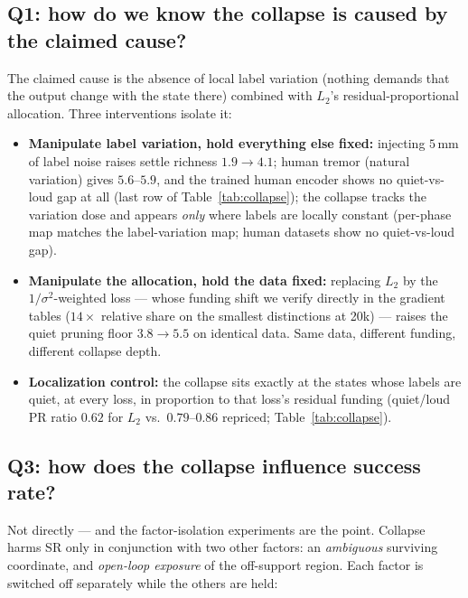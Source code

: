 \documentclass[11pt]{article}
\begin{document}
\subsection*{Q1: how do we know the collapse is caused by the claimed cause?}
The claimed cause is the absence of local label variation (nothing demands
that the output change with the state there) combined with $L_2$'s
residual-proportional allocation. Three interventions isolate it:
\begin{itemize}[leftmargin=1.5em,itemsep=0.2em]
\item \textbf{Manipulate label variation, hold everything else fixed:}
injecting $5$\,mm of label noise raises settle richness $1.9 \to 4.1$; human
tremor (natural variation) gives $5.6$--$5.9$, and the trained human encoder
shows no quiet-vs-loud gap at all (last row of Table~\ref{tab:collapse});
the collapse tracks the variation dose and appears \emph{only} where labels are locally constant
(per-phase map matches the label-variation map; human datasets show no
quiet-vs-loud gap).
\item \textbf{Manipulate the allocation, hold the data fixed:} replacing
$L_2$ by the $1/\sigma^2$-weighted loss --- whose funding shift we verify
directly in the gradient tables ($14\times$ relative share on the smallest
distinctions at 20k) --- raises the quiet pruning floor $3.8 \to 5.5$ on
identical data. Same data, different funding, different collapse depth.
\item \textbf{Localization control:} the collapse sits exactly at the states
whose labels are quiet, at every loss, in proportion to that loss's residual
funding (quiet/loud PR ratio $0.62$ for $L_2$ vs.\ $0.79$--$0.86$ repriced; Table~\ref{tab:collapse}).
\end{itemize}

\subsection*{Q3: how does the collapse influence success rate?}
Not directly --- and the factor-isolation experiments are the point. Collapse
harms SR only in conjunction with two other factors: an \emph{ambiguous}
surviving coordinate, and \emph{open-loop exposure} of the off-support
region. Each factor is switched off separately while the others are held:
\end{document}
